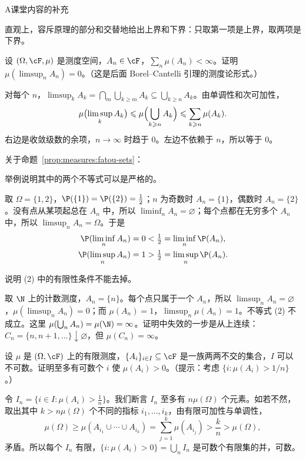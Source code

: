 \begin{exercises}{A}{课堂内容的补充}
\begin{questions}
\begin{solution}
直观上，容斥原理的部分和交替地给出上界和下界：只取第一项是上界，取两项是下界。
\end{solution}
\end{questions}

\item\label{ex:measures:A3} 设 $(\Omega,\cF,\mu)$ 是测度空间，$A_n\in\cF$，$\sum_n\mu(A_n)<\infty$。证明 $\mu(\limsup_nA_n)=0$。（这是后面 Borel–Cantelli 引理的测度论形式。）
\begin{solution}
对每个 $n$，$\limsup_kA_k=\bigcap_m\bigcup_{k\geqslant m}A_k\subseteq\bigcup_{k\geqslant n}A_k$。由单调性和次可加性，
\[
\mu\bigl(\limsup_kA_k\bigr)\leqslant\mu\Bigl(\bigcup_{k\geqslant n}A_k\Bigr)\leqslant\sum_{k\geqslant n}\mu(A_k).
\]
右边是收敛级数的余项，$n\to\infty$ 时趋于 $0$。左边不依赖于 $n$，所以等于 $0$。
\end{solution}

\item\label{ex:measures:A4} 关于命题~\ref{prop:measures:fatou-sets}：
\begin{questions}
\item 举例说明其中的两个不等式可以是严格的。
\begin{solution}
取 $\Omega=\{1,2\}$，$\P(\{1\})=\P(\{2\})=\frac12$；$n$ 为奇数时 $A_n=\{1\}$，偶数时 $A_n=\{2\}$。没有点从某项起总在 $A_n$ 中，所以 $\liminf_nA_n=\varnothing$；每个点都在无穷多个 $A_n$ 中，所以 $\limsup_nA_n=\Omega$。于是
\[
\begin{aligned}
\P(\liminf_nA_n)&=0<\tfrac12=\liminf_n\P(A_n),\\
\P(\limsup_nA_n)&=1>\tfrac12=\limsup_n\P(A_n).
\end{aligned}
\]
\end{solution}
\item 说明 (2) 中的有限性条件不能去掉。
\begin{solution}
取 $\N$ 上的计数测度，$A_n=\{n\}$。每个点只属于一个 $A_n$，所以 $\limsup_nA_n=\varnothing$，$\mu(\limsup_nA_n)=0$；而 $\mu(A_n)=1$，$\limsup_n\mu(A_n)=1$。不等式 (2) 不成立。这里 $\mu(\bigcup_nA_n)=\mu(\N)=\infty$。证明中失效的一步是从上连续：$C_n=\{n,n+1,\dots\}\downarrow\varnothing$，但 $\mu(C_n)=\infty$。
\end{solution}
\end{questions}

\item\label{ex:measures:A5} 设 $\mu$ 是 $(\Omega,\cF)$ 上的有限测度，$\{A_i\}_{i\in I}\subseteq\cF$ 是一族两两不交的集合，$I$ 可以不可数。证明至多有可数个 $i$ 使 $\mu(A_i)>0$。（提示：考虑 $\{i:\mu(A_i)>1/n\}$。）
\begin{solution}
令 $I_n=\{i\in I:\mu(A_i)>\frac1n\}$。我们断言 $I_n$ 至多有 $n\mu(\Omega)$ 个元素。如若不然，取出其中 $k>n\mu(\Omega)$ 个不同的指标 $i_1,\dots,i_k$，由有限可加性与单调性，
\[
\mu(\Omega)\geqslant\mu(A_{i_1}\cup\cdots\cup A_{i_k})=\sum_{j=1}^k\mu(A_{i_j})>\frac kn>\mu(\Omega),
\]
矛盾。所以每个 $I_n$ 有限，$\{i:\mu(A_i)>0\}=\bigcup_nI_n$ 是可数个有限集的并，可数。


\end{solution}
\end{exercises}
